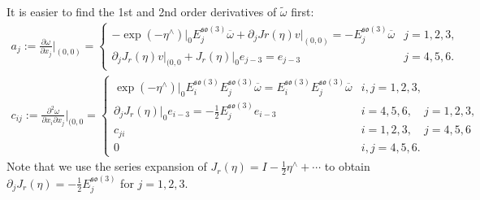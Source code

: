\documentclass[12pt,class=article,crop=false]{standalone}
\begin{document}
It is easier to find the 1st and 2nd order derivatives of $ \widetilde{ \omega}$ first:
\begin{align*}
	a_j := \frac{\partial \omega}{\partial x_j}\bigg|_{(0,0)} =\begin{cases}
		-  \exp( -\eta^\wedge )\big|_{0} E_j^{ \mathfrak{so}(3) } \overline{\omega} + \partial_j Jr(\eta) v\big|_{(0,0)} = - E_j^{ \mathfrak{so}(3) } \overline{\omega} & j = 1,2,3,\\
		\partial_j J_r(\eta)v\big|_{(0,0} + J_r(\eta)\big|_0 e_{j-3} = e_{j-3} & j=4,5,6.
	\end{cases}
\end{align*}
\begin{align*}
	c_{ij} := \frac{\partial^2 \omega}{\partial { x_i} \partial x_j}\bigg|_{(0,0}  = \begin{cases}
		\exp( -\eta^\wedge )\big|_0 E_i^{\mathfrak{so}(3) } E_j^{\mathfrak{so}(3) } \overline{\omega} = E_i^{\mathfrak{so}(3) } E_j^{\mathfrak{so}(3) } \overline{\omega} & i,j=1,2,3,\\
		\partial_j J_r(\eta)\big|_0 e_{i-3} = - \frac{1}{2} E_j^{\mathfrak{so}(3) } e_{i-3} & i=4,5,6,\quad j=1,2,3,\\
		c_{ji} & i = 1,2,3, \quad j = 4,5,6\\
		0 & i,j=4,5,6 .
	\end{cases}
\end{align*}
Note that we use the series expansion of $ J_r(\eta)= I - \frac{1}{2} \eta^\wedge + \cdots$ to obtain $ \partial_j J_r(\eta)  = -\frac{1}{2} E_j^{\mathfrak{so}(3) }$ for $ j=1,2,3$.
\end{document}
